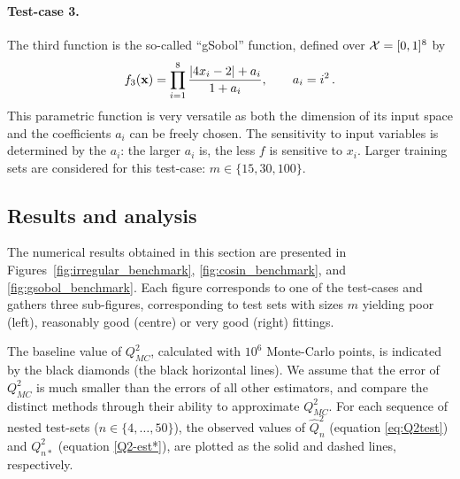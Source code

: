 \paragraph{Test-case 3.}

The third function is the so-called ``gSobol'' function, defined over $\mathcal{X}=[0,1]^8$ by
\begin{equation*}
    f_3({\bf x}) = \prod_{i=1}^{8} \frac{|4x_i - 2| + a_i}{1 + a_i}, \qquad a_i = i^2 \,.
\end{equation*}
This parametric function is very versatile as both the dimension of its input space and the coefficients $a_i$ can be freely chosen. The sensitivity to input variables is determined by the $a_i$: the larger $a_i$ is, the less $f$ is sensitive to $x_i$. Larger  training sets are considered for this test-case: $m\in\{15, 30, 100\}$.

\subsection{Results and analysis}

The numerical results obtained in this section are presented in Figures~\ref{fig:irregular_benchmark}, \ref{fig:cosin_benchmark}, and \ref{fig:gsobol_benchmark}. Each figure corresponds to one of the test-cases and gathers three sub-figures, corresponding to test sets with sizes $m$ yielding  poor (left), reasonably good (centre) or very good (right) fittings. 
 
The baseline value of $Q_{MC}^2$, calculated with $10^6$ Monte-Carlo points, is indicated by the black diamonds (the black  horizontal lines).
We assume that the error of $Q_{MC}^2$ is much smaller than the errors of all other estimators, and compare the distinct methods through their ability to approximate $Q_{MC}^2$. For each sequence of nested test-sets ($n\in\{4,\ldots,50\}$), the observed values of $\widehat Q^2_n$ (equation \eqref{eq:Q2test}) and $Q_{n*}^2$ (equation \eqref{Q2-est*}), are plotted as the solid and dashed lines, respectively.  

